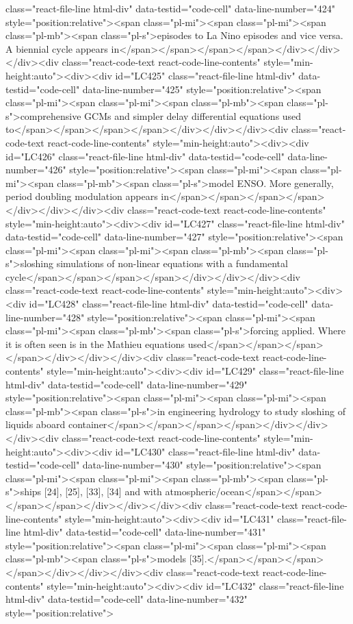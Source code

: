 {{{{{{class="react-file-line html-div" data-testid="code-cell" data-line-number="424" style="position:relative"><span class="pl-mi"><span class="pl-mi"><span class="pl-mb"><span class="pl-s">episodes to La Nino episodes and vice versa. A biennial cycle appears in</span></span></span></span></div></div></div><div class="react-code-text react-code-line-contents" style="min-height:auto"><div><div id="LC425" class="react-file-line html-div" data-testid="code-cell" data-line-number="425" style="position:relative"><span class="pl-mi"><span class="pl-mi"><span class="pl-mb"><span class="pl-s">comprehensive GCMs and simpler delay differential equations used to</span></span></span></span></div></div></div><div class="react-code-text react-code-line-contents" style="min-height:auto"><div><div id="LC426" class="react-file-line html-div" data-testid="code-cell" data-line-number="426" style="position:relative"><span class="pl-mi"><span class="pl-mi"><span class="pl-mb"><span class="pl-s">model ENSO. More generally, period doubling modulation appears in</span></span></span></span></div></div></div><div class="react-code-text react-code-line-contents" style="min-height:auto"><div><div id="LC427" class="react-file-line html-div" data-testid="code-cell" data-line-number="427" style="position:relative"><span class="pl-mi"><span class="pl-mi"><span class="pl-mb"><span class="pl-s">sloshing simulations of non-linear equations with a fundamental cycle</span></span></span></span></div></div></div><div class="react-code-text react-code-line-contents" style="min-height:auto"><div><div id="LC428" class="react-file-line html-div" data-testid="code-cell" data-line-number="428" style="position:relative"><span class="pl-mi"><span class="pl-mi"><span class="pl-mb"><span class="pl-s">forcing applied. Where it is often seen is in the Mathieu equations used</span></span></span></span></div></div></div><div class="react-code-text react-code-line-contents" style="min-height:auto"><div><div id="LC429" class="react-file-line html-div" data-testid="code-cell" data-line-number="429" style="position:relative"><span class="pl-mi"><span class="pl-mi"><span class="pl-mb"><span class="pl-s">in engineering hydrology to study sloshing of liquids aboard container</span></span></span></span></div></div></div><div class="react-code-text react-code-line-contents" style="min-height:auto"><div><div id="LC430" class="react-file-line html-div" data-testid="code-cell" data-line-number="430" style="position:relative"><span class="pl-mi"><span class="pl-mi"><span class="pl-mb"><span class="pl-s">ships {[}24{]}, {[}25{]}, {[}33{]}, {[}34{]} and with atmospheric/ocean</span></span></span></span></div></div></div><div class="react-code-text react-code-line-contents" style="min-height:auto"><div><div id="LC431" class="react-file-line html-div" data-testid="code-cell" data-line-number="431" style="position:relative"><span class="pl-mi"><span class="pl-mi"><span class="pl-mb"><span class="pl-s">models {[}35{]}.</span></span></span></span></div></div></div><div class="react-code-text react-code-line-contents" style="min-height:auto"><div><div id="LC432" class="react-file-line html-div" data-testid="code-cell" data-line-number="432" style="position:relative">
}}}}}}
